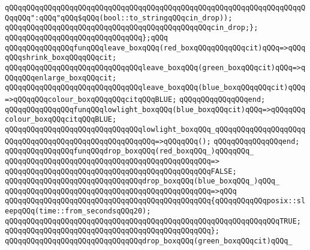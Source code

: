 \verb|qQQqqQQqqQQqqQQqqQQqqQQqqQQqqQQqqQQqqQQqqQQqqQQqqQQqqQQqqQQqqQQqqQQqqQQqqQQq":qQQq"qQQq$qQQq(bool::to_stringqQQqcin_drop));|\newline
\verb|qQQqqQQqqQQqqQQqqQQqqQQqqQQqqQQqqQQqqQQqqQQqqQQqcin_drop;};|\newline
\verb|qQQqqQQqqQQqqQQqqQQqqQQqqQQqqQQq};qQQq|\newline
\newline
\verb|qQQqqQQqqQQqqQQqfunqQQqleave_boxqQQq(red_boxqQQqqQQqqQQqcit)qQQq=>qQQqqQQqshrink_boxqQQqqQQqcit;|\newline
\verb|qQQqqQQqqQQqqQQqqQQqqQQqqQQqqQQqleave_boxqQQq(green_boxqQQqcit)qQQq=>qQQqqQQqenlarge_boxqQQqcit;|\newline
\verb|qQQqqQQqqQQqqQQqqQQqqQQqqQQqqQQqleave_boxqQQq(blue_boxqQQqqQQqcit)qQQq=>qQQqqQQqcolour_boxqQQqqQQqcitqQQqBLUE;|\newline
\verb|qQQqqQQqqQQqqQQqend;|\newline
\newline
\verb|qQQqqQQqqQQqqQQqfunqQQqlowlight_boxqQQq(blue_boxqQQqcit)qQQq=>qQQqqQQqcolour_boxqQQqcitqQQqBLUE;|\newline
\verb|qQQqqQQqqQQqqQQqqQQqqQQqqQQqqQQqlowlight_boxqQQq_qQQqqQQqqQQqqQQqqQQqqQQqqQQqqQQqqQQqqQQqqQQqqQQqqQQqqQQq=>qQQqqQQq();|\newline
\verb|qQQqqQQqqQQqqQQqend;|\newline
\newline
\newline
\verb|qQQqqQQqqQQqqQQqfunqQQqdrop_boxqQQq(red_boxqQQq_)qQQqqQQq_|\newline
\verb|qQQqqQQqqQQqqQQqqQQqqQQqqQQqqQQqqQQqqQQqqQQqqQQq=>|\newline
\verb|qQQqqQQqqQQqqQQqqQQqqQQqqQQqqQQqqQQqqQQqqQQqqQQqFALSE;|\newline
\newline
\verb|qQQqqQQqqQQqqQQqqQQqqQQqqQQqqQQqdrop_boxqQQq(blue_boxqQQq_)qQQq_|\newline
\verb|qQQqqQQqqQQqqQQqqQQqqQQqqQQqqQQqqQQqqQQqqQQqqQQq=>qQQq|\newline
\verb|qQQqqQQqqQQqqQQqqQQqqQQqqQQqqQQqqQQqqQQqqQQqqQQq{qQQqqQQqqQQqposix::sleepqQQq(time::from_secondsqQQq20);|\newline
\verb|qQQqqQQqqQQqqQQqqQQqqQQqqQQqqQQqqQQqqQQqqQQqqQQqqQQqqQQqqQQqqQQqTRUE;|\newline
\verb|qQQqqQQqqQQqqQQqqQQqqQQqqQQqqQQqqQQqqQQqqQQqqQQq};|\newline
\newline
\verb|qQQqqQQqqQQqqQQqqQQqqQQqqQQqqQQqdrop_boxqQQq(green_boxqQQqcit)qQQq_|\newline
